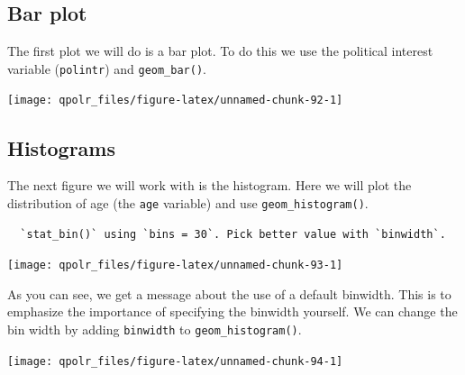\documentclass[12pt,oneside]{reedthesis}
\theoremstyle{definition}
\theoremstyle{definition}
\theoremstyle{definition}
\theoremstyle{remark}
\begin{document}
  \subsection{Bar plot}\label{bar-plot}
  
  The first plot we will do is a bar plot. To do this we use the political
  interest variable (\texttt{polintr}) and \texttt{geom\_bar()}.
  \begin{Shaded}
  \begin{Highlighting}[]
  \NormalTok{(}\OperatorTok{+}
  \StringTok{  }\NormalTok{() }
  \end{Highlighting}
  \end{Shaded}
  \begin{center}\texttt{[image: qpolr\_files/figure-latex/unnamed-chunk-92-1]} \end{center}
  
  \subsection{Histograms}\label{histograms}
  
  The next figure we will work with is the histogram. Here we will plot
  the distribution of age (the \texttt{age} variable) and use
  \texttt{geom\_histogram()}.
  \begin{Shaded}
  \begin{Highlighting}[]
  \NormalTok{(}\OperatorTok{+}
  \StringTok{  }\NormalTok{() }
  \end{Highlighting}
  \end{Shaded}
  \begin{verbatim}
  `stat_bin()` using `bins = 30`. Pick better value with `binwidth`.
  \end{verbatim}
  \begin{center}\texttt{[image: qpolr\_files/figure-latex/unnamed-chunk-93-1]} \end{center}
  
  As you can see, we get a message about the use of a default binwidth.
  This is to emphasize the importance of specifying the binwidth yourself.
  We can change the bin width by adding \texttt{binwidth} to
  \texttt{geom\_histogram()}.
  \begin{Shaded}
  \begin{Highlighting}[]
  \NormalTok{(}\OperatorTok{+}
  \StringTok{  }\NormalTok{(} \NormalTok{)}
  \end{Highlighting}
  \end{Shaded}
  \begin{center}\texttt{[image: qpolr\_files/figure-latex/unnamed-chunk-94-1]} \end{center}
  
\end{document}
